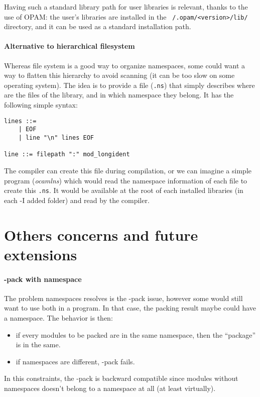 Having such a standard library path for user libraries is relevant, thanks to
the use of OPAM: the user's libraries are installed in the
\texttt{~/.opam/<version>/lib/} directory, and it can be used as a standard
installation path. 

\paragraph{Alternative to hierarchical filesystem}

Whereas file system is a good way to organize namespaces, some could want a way
to flatten this hierarchy to avoid scanning (it can be too slow on some
operating system). The idea is to provide a file (\texttt{.ns}) that simply
describes where are the files of the library, and in which namespace they
belong. It has the following simple syntax:

\begin{verbatim}
lines ::=
    | EOF
    | line "\n" lines EOF

line ::= filepath ":" mod_longident
\end{verbatim}

The compiler can create this file during compilation, or we can imagine a simple
program (\emph{ocamlns}) which would read the namespace information of each file
to create this \texttt{.ns}. It would be available at the root of each installed
libraries (in each -I added folder) and read by the compiler.


\section{Others concerns and future extensions}

\paragraph{-pack with namespace}

The problem namespaces resolves is the -pack issue, however some would still
want to use both in a program. In that case, the packing result maybe could have
a namespace. The behavior is then:
\begin{itemize}
\item if every modules to be packed are in the same namespace, then the
  ``package'' is in the same.
\item if namespaces are different, -pack fails.
\end{itemize}

In this constraints, the -pack is backward compatible since modules without
namespaces doesn't belong to a namespace at all (at least virtually).

